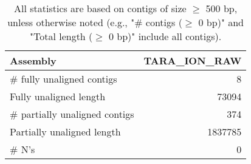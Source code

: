 \documentclass[12pt,a4paper]{article}
\begin{document}
\begin{table}[ht]
\begin{center}
\caption{All statistics are based on contigs of size $\geq$ 500 bp, unless otherwise noted (e.g., "\# contigs ($\geq$ 0 bp)" and "Total length ($\geq$ 0 bp)" include all contigs).}
\begin{tabular}{|l*{1}{|r}|}
\hline
Assembly & TARA\_ION\_RAW \\ \hline
\# fully unaligned contigs & 8 \\ \hline
Fully unaligned length & 73094 \\ \hline
\# partially unaligned contigs & 374 \\ \hline
Partially unaligned length & 1837785 \\ \hline
\# N's & 0 \\ \hline
\end{tabular}
\end{center}
\end{table}
\end{document}

